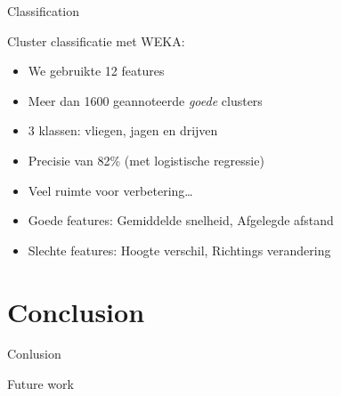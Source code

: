\documentclass{beamer}
\newcommand{\slide}[2]
{
\begin{frame}
\begin{block}{#1} 

#2

\end{block} \end{frame}
}
\begin{document}
\slide{Classification}
{
Cluster classificatie met WEKA:
\begin{itemize}
	\item We gebruikte 12 features
	\item Meer dan 1600 geannoteerde \emph{goede} clusters
	\item 3 klassen: vliegen, jagen en drijven
	\item Precisie van 82\% (met logistische regressie)
	\item Veel ruimte voor verbetering\ldots
\end{itemize}


\begin{itemize}
\item Goede features: Gemiddelde snelheid, Afgelegde afstand
\newline
\item Slechte features: Hoogte verschil, Richtings verandering
\end{itemize}
}

\section{Conclusion}

\slide{Conlusion}
{
	
}

\slide{Future work}
{
	
}
\end{document}
